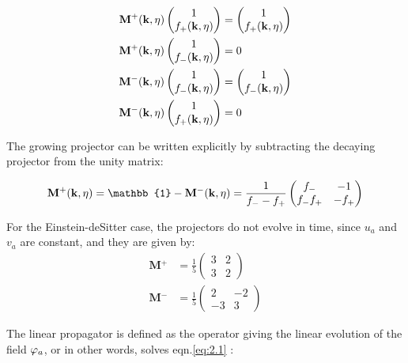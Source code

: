 \begin{align*}
\mathrm{\mathbf{M}}{}^{+}(\mathbf{k},\eta)\begin{pmatrix}1\\
f_{+}(\mathbf{k},\eta)
\end{pmatrix} & =\begin{pmatrix}1\\
f_{+}(\mathbf{k},\eta)
\end{pmatrix}\\
\mathrm{\mathbf{M}}{}^{+}(\mathbf{k},\eta)\begin{pmatrix}1\\
f_{-}(\mathbf{k},\eta)
\end{pmatrix} & =0\\
\mathbf{\mathrm{\mathbf{M}}}^{-}(\mathbf{k},\eta)\begin{pmatrix}1\\
f_{-}(\mathbf{k},\eta)
\end{pmatrix} & =\begin{pmatrix}1\\
f_{-}(\mathbf{k},\eta)
\end{pmatrix}\\
\mathrm{\mathbf{M}}^{-}(\mathbf{k},\eta)\begin{pmatrix}1\\
f_{+}(\mathbf{k},\eta)
\end{pmatrix} & =0
\end{align*}


The growing projector can be written explicitly by subtracting the
decaying projector from the unity matrix:

\[
\mathrm{\mathbf{M}}{}^{+}\pkn=\mathbb{1}-\mathrm{\mathbf{M}}{}^{-}\pkn=\frac{1}{f_{-}-f_{+}}\begin{pmatrix}f_{-} & -1\\
f_{-}f_{+} & -f_{+}
\end{pmatrix}
\]


For the Einstein-deSitter case, the projectors do not evolve in time,
since $u_{a}$ and $v_{a}$ are constant, and they are given by: 
\begin{align*}
\mathrm{\mathbf{M}}{}^{+} & =\frac{1}{5}\begin{pmatrix}3 & 2\\
3 & 2
\end{pmatrix}\\
\mathrm{\mathbf{M}}{}^{-} & =\frac{1}{5}\begin{pmatrix}2 & -2\\
-3 & 3
\end{pmatrix}
\end{align*}


The linear propagator is defined as the operator giving the linear
evolution of the field $\varphi_{a}$, or in other words, solves eqn.\ref{eq:2.1}
:

